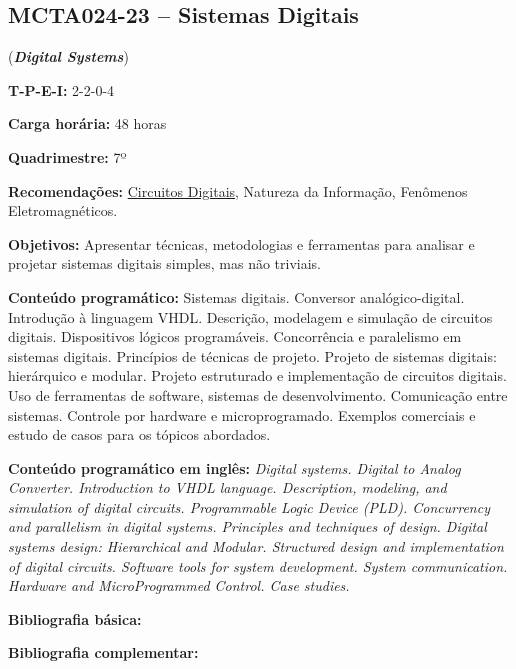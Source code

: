 \documentclass[class=article, crop=false]{standalone}
\begin{document}
\subsection*{MCTA024-23 -- Sistemas Digitais}
\label{disc:sist_dig}

(\textbf{\textit{Digital Systems}})

\begin{center}
    \begin{minipage}{0.85\textwidth}
        \textbf{T-P-E-I:} 2-2-0-4
        
        \textbf{Carga horária:} 48 horas
        
        \textbf{Quadrimestre:} 7º
        
        \textbf{Recomendações:} 
        \hyperref[disc:circ_dig]{Circuitos Digitais}, 
        Natureza da Informação,
        Fenômenos Eletromagnéticos.
    \end{minipage}
\end{center}

\textbf{Objetivos:}
Apresentar técnicas, metodologias e ferramentas para analisar e projetar
sistemas digitais simples, mas não triviais.

\textbf{Conteúdo programático:}
Sistemas digitais. 
Conversor analógico-digital. 
Introdução à linguagem VHDL. 
Descrição, modelagem e simulação de circuitos digitais. 
Dispositivos lógicos programáveis. 
Concorrência e paralelismo em sistemas digitais. 
Princípios de técnicas de projeto. 
Projeto de sistemas digitais: hierárquico e modular. 
Projeto estruturado e implementação de circuitos digitais. 
Uso de ferramentas de software, sistemas de desenvolvimento. 
Comunicação entre sistemas. 
Controle por hardware e microprogramado. 
Exemplos comerciais e estudo de casos para os tópicos abordados.

\textbf{Conteúdo programático em inglês:}
\textit{Digital systems. 
Digital to Analog Converter. 
Introduction to VHDL language. 
Description, modeling, and simulation of digital circuits. 
Programmable Logic Device (PLD). 
Concurrency and parallelism in digital systems. 
Principles and techniques of design. 
Digital systems design: Hierarchical and Modular. 
Structured design and implementation of digital circuits. 
Software tools for system development. 
System communication. 
Hardware and MicroProgrammed Control. 
Case studies.}

\newrefsection
\textbf{Bibliografia básica:}
\nocite{2008-mano, 2007-tocci, 2008-vahid}
\printbibliography

\newrefsection
\textbf{Bibliografia complementar:}
\nocite{2006-idoeta, 2000-ercegovac, 2009-bignel, 2005-katz, 2008-ashenden}
\printbibliography
\end{document}
